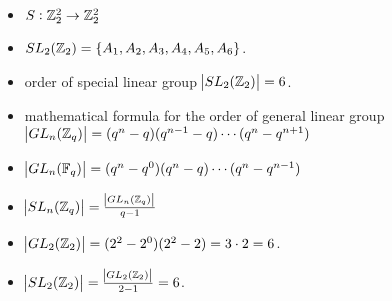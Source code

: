 
\begin{itemize}
	\item $S:\mathbb{Z}_2^2\to\mathbb{Z}_2^2$
	\item $SL_2(\mathbb{Z}_2)=\set{A_1,A_2,A_3,A_4,A_5,A_6}$.
	\item order of special linear group $\abs{SL_2(\mathbb{Z}_2)}=6$.
	\item mathematical formula for the order of general linear group $\abs{GL_n(\mathbb{Z}_q)}=(q^n-q)(q^{n-1}-q)\cdots(q^n-q^{n+1})$
	\item $\abs{GL_n(\mathbb{F}_q)}=(q^n-q^0)(q^n-q)\cdots(q^n-q^{n-1})$
	\item $\abs{SL_n(\mathbb{Z}_q)}=\frac{\abs{GL_n(\mathbb{Z}_q)}}{q-1}$
	\item $\abs{GL_2(\mathbb{Z}_2)}=(2^2-2^0)(2^2-2)=3\cdot 2 = 6$.
	\item $\abs{SL_2(\mathbb{Z}_2)}=\frac{\abs{GL_2(\mathbb{Z}_2)}}{2-1}=6$.
\end{itemize}